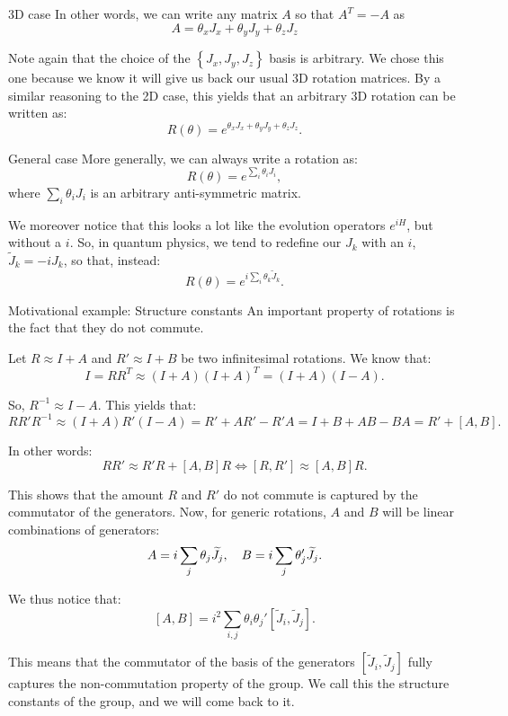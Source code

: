\documentclass[a4paper]{article}
\begin{document}
\begin{parag}{}
\begin{subparag}{3D case}
        In other words, we can write any matrix $A$ so that $A^T = -A$ as
        \[A = \theta_x J_x + \theta_y J_y + \theta_z J_z\]

        Note again that the choice of the $\left\{J_x, J_y, J_z\right\}$ basis is arbitrary. We chose this one because we know it will give us back our usual 3D rotation matrices. By a similar reasoning to the 2D case, this yields that an arbitrary 3D rotation can be written as: 
        \[R\left(\theta\right) = e^{\theta_x J_x + \theta_y J_y + \theta_z J_z}.\]
    \end{subparag}

    \begin{subparag}{General case}
        More generally, we can always write a rotation as:
        \[R\left(\theta\right) = e^{\sum_{i} \theta_i J_i},\]
        where $\sum_{i} \theta_i J_i$ is an arbitrary anti-symmetric matrix.

        We moreover notice that this looks a lot like the evolution operators $e^{i H}$, but without a $i$. So, in quantum physics, we tend to redefine our $J_k$ with an $i$, $\widetilde{J}_k = -i J_k$, so that, instead:
        \[R\left(\theta\right) = e^{i \sum_{i} \theta_k \widetilde{J}_k}.\]
    \end{subparag}
\end{parag}

\begin{parag}{Motivational example: Structure constants}
    An important property of rotations is the fact that they do not commute.

    Let $R \approx I + A$ and $R' \approx I + B$ be two infinitesimal rotations. We know that: 
    \[I = R R^T \approx \left(I + A\right)\left(I + A\right)^T = \left(I + A\right)\left(I - A\right).\]
    
    So, $R^{-1} \approx I - A$. This yields that:
    \[R R' R^{-1} \approx \left(I + A\right)R' \left(I - A\right) = R' + A R' - R'A = I + B + AB - BA = R' + \left[A, B\right].\]

    In other words: 
    \[R R' \approx R' R + \left[A, B\right]R \iff \left[R, R'\right] \approx \left[A, B\right]R.\]
    
    This shows that the amount $R$ and $R'$ do not commute is captured by the commutator of the generators. Now, for generic rotations, $A$ and $B$ will be linear combinations of generators: 
    \[A = i \sum_{j} \theta_j \widetilde{J}_j, \quad B = i \sum_{j} \theta_j' \widetilde{J}_j.\]
    
    We thus notice that: 
    \[\left[A, B\right] = i^2 \sum_{i, j} \theta_i \theta_j' \left[\widetilde{J}_i, \widetilde{J}_j\right].\]

    This means that the commutator of the basis of the generators $\left[\widetilde{J}_i, \widetilde{J}_j\right]$ fully captures the non-commutation property of the group. We call this the structure constants of the group, and we will come back to it.
\end{parag}
\end{document}

